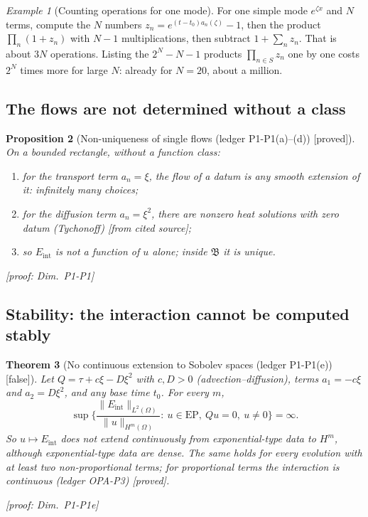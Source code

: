 \documentclass[11pt]{article}
\theoremstyle{plain}
\newtheorem{theorem}{Theorem}[section]
\newtheorem{proposition}[theorem]{Proposition}
\theoremstyle{definition}
\theoremstyle{remark}
\newtheorem{example}[theorem]{Example}
\newcommand{\EP}{\mathrm{EP}}               %
\newcommand{\Eint}{E_{\mathrm{int}}}        %
\newcommand{\badge}[2]{\textcolor{#1}{\textsf{\footnotesize[#2]}}}
\newcommand{\proved}[1][]{\badge{cC}{proved#1}}
\newcommand{\falsest}{\badge{cB}{false}}
\newcommand{\led}[1]{\textcolor{cG}{\textsf{\footnotesize(ledger #1)}}}
\newcommand{\dimref}[1]{\textsf{\footnotesize[proof: Dim.~#1]}}
\newcommand{\cf}{\badge{cD}{from cited source}}
\newcommand{\Bclass}{\mathfrak{B}}
\begin{document}
\begin{example}[{Counting operations for one mode}]
For one simple mode $e^{\zeta x}$ and $N$ terms, compute the $N$ numbers $z_n=e^{(t-t_0)a_n(\zeta)}-1$, then the product $\prod_n(1+z_n)$ with $N-1$ multiplications, then subtract $1+\sum_nz_n$. That is about $3N$ operations. Listing the $2^N-N-1$ products $\prod_{n\in S}z_n$ one by one costs $2^N$ times more for large $N$: already for $N=20$, about a million.
\end{example}

\subsection{The flows are not determined without a class}

\begin{proposition}[{Non-uniqueness of single flows \led{P1-P1(a)--(d)} \proved}]\label{prop:nonuniq}
On a bounded rectangle, without a function class:
\begin{enumerate}[label=(\alph*)]
\item for the transport term $a_n=\xi$, the flow of a datum is any smooth extension of it: infinitely many choices;
\item for the diffusion term $a_n=\xi^2$, there are nonzero heat solutions with zero datum (Tychonoff) \cf;
\item so $\Eint$ is not a function of $u$ alone; inside $\Bclass$ it is unique.
\end{enumerate}
\dimref{P1-P1}
\end{proposition}

\subsection{Stability: the interaction cannot be computed stably}

\begin{theorem}[{No continuous extension to Sobolev spaces \led{P1-P1(e)} \falsest}]\label{f:thm:nocont}
Let $Q=\tau+c\xi-D\xi^2$ with $c,D>0$ (advection--diffusion), terms $a_1=-c\xi$ and $a_2=D\xi^2$, and any base time $t_0$. For every $m$,
\[
\sup\Big\{\frac{\|\Eint\|_{L^2(\Omega)}}{\|u\|_{H^m(\Omega)}}:\ u\in\EP,\ Qu=0,\ u\ne0\Big\}=\infty .
\]
So $u\mapsto\Eint$ does not extend continuously from exponential-type data to $H^m$, although exponential-type data are dense. The same holds for every evolution with at least two non-proportional terms; for proportional terms the interaction is continuous \led{OPA-P3} \proved.

\dimref{P1-P1e}
\end{theorem}
\end{document}
